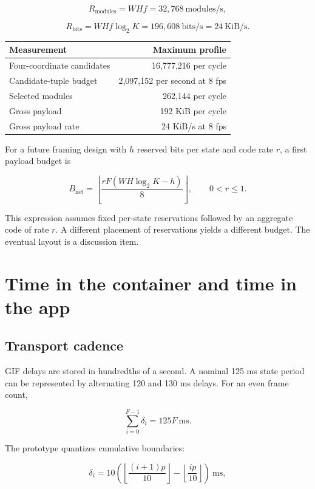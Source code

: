 \documentclass[
  11pt,
  a4paper,
]{article}
\begin{document}
\[
R_{\mathrm{modules}}=WHf=32{,}768
\ \text{modules/s},
\]

\[
R_{\mathrm{bits}}=WHf\log_2K
=196{,}608\ \text{bits/s}
=24\ \text{KiB/s}.
\]

\begin{longtable}[]{@{}lr@{}}
\toprule\noalign{}
Measurement & Maximum profile \\
\midrule\noalign{}
\endhead
\bottomrule\noalign{}
\endlastfoot
Four-coordinate candidates & 16,777,216 per cycle \\
Candidate-tuple budget & 2,097,152 per second at 8 fps \\
Selected modules & 262,144 per cycle \\
Gross payload & 192 KiB per cycle \\
Gross payload rate & 24 KiB/s at 8 fps \\
\end{longtable}

For a future framing design with \(h\) reserved bits per state and code
rate \(r\), a first payload budget is

\[
B_{\mathrm{net}}=
\left\lfloor\frac{rF(WH\log_2K-h)}8\right\rfloor,
\qquad 0<r\le1.
\]

This expression assumes fixed per-state reservations followed by an
aggregate code of rate \(r\). A different placement of reservations
yields a different budget. The eventual layout is a discussion item.

\hypertarget{time-in-the-container-and-time-in-the-app}{%
\section{Time in the container and time in the
app}\label{time-in-the-container-and-time-in-the-app}}

\hypertarget{transport-cadence}{%
\subsection{Transport cadence}\label{transport-cadence}}

GIF delays are stored in hundredths of a second. A nominal 125 ms state
period can be represented by alternating 120 and 130 ms delays. For an
even frame count,

\[
\sum_{i=0}^{F-1}\delta_i=125F\ \text{ms}.
\]

The prototype quantizes cumulative boundaries:

\[
\delta_i=
10\left(
\left\lfloor\frac{(i+1)p}{10}\right\rfloor
-\left\lfloor\frac{ip}{10}\right\rfloor
\right)\ \text{ms},
\]
\end{document}
